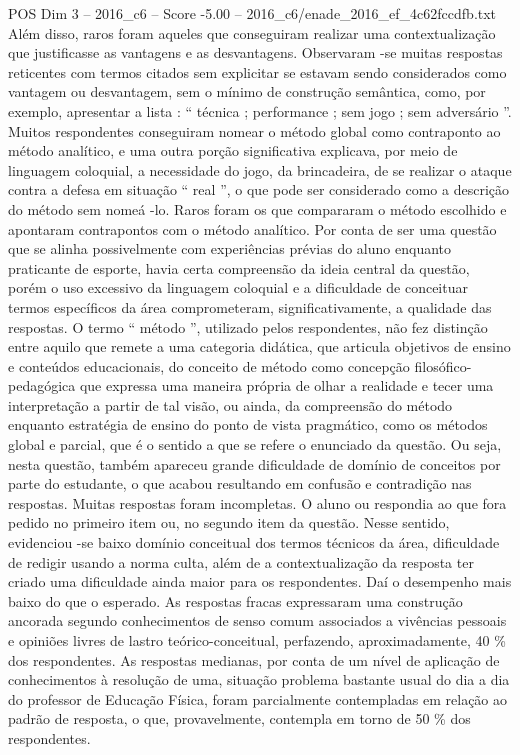 \begin{textsample}{POS Dim 3 – 2016\_c6 – Score -5.00 – 2016\_c6/enade\_2016\_ef\_4c62fccdfb.txt}
Além disso, raros foram aqueles que conseguiram realizar uma contextualização que justificasse as vantagens e as desvantagens.
Observaram -se muitas respostas reticentes com termos citados sem explicitar se estavam sendo considerados como vantagem ou desvantagem, sem o mínimo de construção semântica, como, por exemplo, apresentar a lista : “ técnica ; performance ; sem jogo ; sem adversário ”.
Muitos respondentes conseguiram nomear o método global como contraponto ao método analítico, e uma outra porção significativa explicava, por meio de linguagem coloquial, a necessidade do jogo, da brincadeira, de se realizar o ataque contra a defesa em situação “ real ”, o que pode ser considerado como a descrição do método sem nomeá -lo.
Raros foram os que compararam o método escolhido e apontaram contrapontos com o método analítico.
Por conta de ser uma questão que se alinha possivelmente com experiências prévias do aluno enquanto praticante de esporte, havia certa compreensão da ideia central da questão, porém o uso excessivo da linguagem coloquial e a dificuldade de conceituar termos específicos da área comprometeram, significativamente, a qualidade das respostas.
O termo “ método ”, utilizado pelos respondentes, não fez distinção entre aquilo que remete a uma categoria didática, que articula objetivos de ensino e conteúdos educacionais, do conceito de método como concepção filosófico-pedagógica que expressa uma maneira própria de olhar a realidade e tecer uma interpretação a partir de tal visão, ou ainda, da compreensão do método enquanto estratégia de ensino do ponto de vista pragmático, como os métodos global e parcial, que é o sentido a que se refere o enunciado da questão.
Ou seja, nesta questão, também apareceu grande dificuldade de domínio de conceitos por parte do estudante, o que acabou resultando em confusão e contradição nas respostas.
Muitas respostas foram incompletas.
O aluno ou respondia ao que fora pedido no primeiro item ou, no segundo item da questão.
Nesse sentido, evidenciou -se baixo domínio conceitual dos termos técnicos da área, dificuldade de redigir usando a norma culta, além de a contextualização da resposta ter criado uma dificuldade ainda maior para os respondentes.
Daí o desempenho mais baixo do que o esperado.
As respostas fracas expressaram uma construção ancorada segundo conhecimentos de senso comum associados a vivências pessoais e opiniões livres de lastro teórico-conceitual, perfazendo, aproximadamente, 40 \% dos respondentes.
As respostas medianas, por conta de um nível de aplicação de conhecimentos à resolução de uma, situação problema bastante usual do dia a dia do professor de Educação Física, foram parcialmente contempladas em relação ao padrão de resposta, o que, provavelmente, contempla em torno de 50 \% dos respondentes.

\end{textsample}
